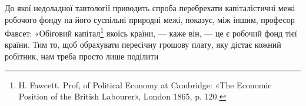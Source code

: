 До якої недоладної тавтології приводить спроба перебрехати
капіталістичні межі робочого фонду на його суспільні
природні межі, показує, між іншим, професор Фавсет: «Обіговий
капітал\footnote{
Н. Fawcett. Prof, of Political Economy at Cambridge: «The Economic
Position of the British Labourer», London 1865, p. 120.
} якоїсь країни, — каже він, — це є робочий фонд
тієї країни. Тим то, щоб обрахувати пересічну грошову плату,
яку дістає кожний робітник, нам треба просто лише поділити
\parbreak{}  %
